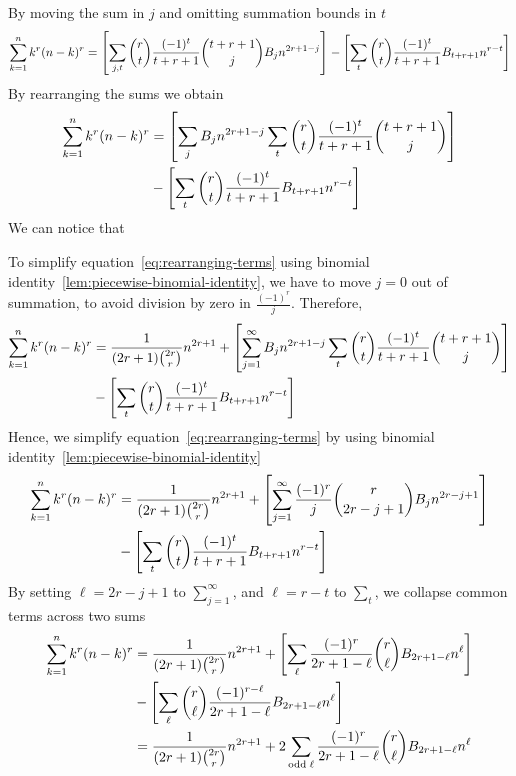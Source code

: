By moving the sum in $j$ and omitting summation bounds in $t$
\begin{align*}
    \sum_{k=1}^{n} k^{r} (n-k)^{r}
    = \left[ \sum_{j, t} \binom{r}{t} \frac{(-1)^t}{t+r+1} \binom{t+r+1}{j} {B}\sb{j} n^{2r+1-j}  \right]
    - \left[ \sum_{t} \binom{r}{t} \frac{(-1)^t}{t+r+1} {B}\sb{t+r+1} n^{r-t} \right]
\end{align*}
By rearranging the sums we obtain
\begin{align}
    \label{eq:rearranging-terms}
    \sum_{k=1}^{n} k^{r} (n-k)^{r}
    &= \left[ \sum_{j} {B}\sb{j} n^{2r+1-j} \sum_{t} \binom{r}{t} \frac{(-1)^t}{t+r+1} \binom{t+r+1}{j}  \right] \\
    &- \left[ \sum_{t} \binom{r}{t} \frac{(-1)^t}{t+r+1} {B}\sb{t+r+1} n^{r-t} \right] \nonumber
\end{align}
We can notice that

To simplify equation~\eqref{eq:rearranging-terms} using binomial identity~\eqref{lem:piecewise-binomial-identity}, we have to move $j=0$ out of
summation, to avoid division by zero in $\frac{(-1)^r}{j}$.
Therefore,
\begin{equation*}
    \begin{split}
        \sum_{k=1}^{n} k^{r} (n-k)^{r}
        &= \frac{1}{(2r+1) \binom{2r}r} n^{2r+1}
        + \left[ \sum_{j = 1}^{\infty} {B}\sb{j} n^{2r+1-j} \sum_{t} \binom{r}{t} \frac{(-1)^t}{t+r+1} \binom{t+r+1}{j} \right] \\
        &- \left[ \sum_{t} \binom{r}{t} \frac{(-1)^t}{t+r+1} {B}\sb{t+r+1} n^{r-t} \right]
    \end{split}
\end{equation*}
Hence, we simplify equation~\eqref{eq:rearranging-terms} by using binomial identity~\eqref{lem:piecewise-binomial-identity}
\begin{equation*}
    \begin{split}
        \sum_{k=1}^{n} k^{r} (n-k)^{r}
        &= \frac{1}{(2r+1) \binom{2r}r} n^{2r+1}
        + \left[ \sum_{j=1}^{\infty} \frac{(-1)^r}{j} \binom{r}{2r-j+1} {B}\sb{j} n^{2r-j+1} \right] \\
        &- \left[ \sum_{t} \binom{r}{t} \frac{(-1)^t}{t+r+1} {B}\sb{t+r+1} n^{r-t} \right]
    \end{split}
\end{equation*}
By setting $\ell=2r-j+1$ to $\sum_{j=1}^{\infty}$, and $\ell=r-t$ to $\sum_{t}$,
we collapse common terms across two sums
\begin{align*}
    \sum_{k=1}^{n} k^{r} (n-k)^{r}
    &= \frac{1}{(2r+1) \binom{2r}r} n^{2r+1}
    + \left[ \sum_{\ell} \frac{(-1)^r}{2r+1-\ell} \binom{r}{\ell} {B}\sb{2r+1-\ell} n^{\ell} \right] \\
    &- \left[ \sum_{\ell} \binom{r}{\ell} \frac{(-1)^{r-\ell}}{2r+1-\ell} {B}\sb{2r+1-\ell} n^{\ell} \right]\\
    &= \frac{1}{(2r+1) \binom{2r}r} n^{2r+1} + 2 \sum_{\mathrm{odd \; \ell}} \frac{(-1)^r}{2r+1-\ell} \binom{r}{\ell} {B}\sb{2r+1-\ell} n^{\ell}
\end{align*}
